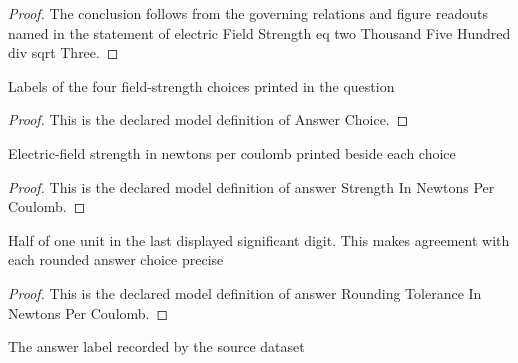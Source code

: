 \begin{proof}
  The conclusion follows from the governing relations and figure readouts named in the statement of electric Field Strength eq two Thousand Five Hundred div sqrt Three.
\end{proof}
\begin{definition}
  \label{def:physics:phyx-mini-0845:phyxminiproblems-problemphyxmini0845-answerchoice}
  Labels of the four field-strength choices printed in the question
\end{definition}
\begin{proof}
  This is the declared model definition of Answer Choice.
\end{proof}
\begin{definition}
  \label{def:physics:phyx-mini-0845:phyxminiproblems-problemphyxmini0845-answerstrengthinnewtonspercoulomb}
  Electric-field strength in newtons per coulomb printed beside each choice
\end{definition}
\begin{proof}
  This is the declared model definition of answer Strength In Newtons Per Coulomb.
\end{proof}
\begin{definition}
  \label{def:physics:phyx-mini-0845:phyxminiproblems-problemphyxmini0845-answerroundingtoleranceinnewtonspercoulomb}
  Half of one unit in the last displayed significant digit. This makes agreement with each rounded answer choice precise
\end{definition}
\begin{proof}
  This is the declared model definition of answer Rounding Tolerance In Newtons Per Coulomb.
\end{proof}
\begin{definition}
  \label{def:physics:phyx-mini-0845:phyxminiproblems-problemphyxmini0845-recordeddatasetanswer}
  The answer label recorded by the source dataset
\end{definition}
